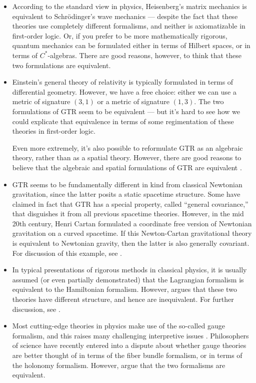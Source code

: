 \begin{itemize}
\item According to the standard view in physics, Heisenberg's matrix
  mechanics is equivalent to Schr{\"o}dinger's wave mechanics ---
  despite the fact that these theories use completely different
  formalisms, and neither is axiomatizable in first-order logic.  Or,
  if you prefer to be more mathematically rigorous, quantum mechanics
  can be formulated either in terms of Hilbert spaces, or in terms of
  $C^*$-algebras.  There are good reasons, however, to think that
  these two formulations are equivalent.
\item Einstein's general theory of relativity is typically formulated
  in terms of differential geometry.  However, we have a free choice:
  either we can use a metric of signature $(3,1)$ or a metric of
  signature $(1,3)$.  The two formulations of GTR seem to be
  equivalent --- but it's hard to see how we could explicate that
  equivalence in terms of some regimentation of these theories in
  first-order logic.

  Even more extremely, it's also possible to reformulate GTR as an
  algebraic theory, rather than as a spatial theory.  However, there
  are good reasons to believe that the algebraic and spatial
  formulations of GTR are equivalent
  \citep[see][]{rosenstock,weatherall2015}.
  
\item GTR seems to be fundamentally different in kind from classical
  Newtonian gravitation, since the latter posits a static spacetime
  structure.  Some have claimed in fact that GTR has a special
  property, called ``general covariance,'' that disguishes it from all
  previous spacetime theories.  However, in the mid 20th century,
  Henri Cartan formulated a coordinate free version of Newtonian
  gravitation on a curved spacetime.  If this Newton-Cartan
  gravitational theory is equivalent to Newtonian gravity, then the
  latter is also generally covariant.  For discussion of this example,
  see \cite{glymour1977,knox2013,weatherall-erk}.

\item In typical presentations of rigorous methods in classical
  physics, it is usually assumed (or even partially demonstrated) that
  the Lagrangian formalism is equivalent to the Hamiltonian formalism.
  However, \cite{north2009} argues that these two theories have
  different structure, and hence are inequivalent.  For further
  discussion, see
  \cite{halvorsonunpublished,swansonhalvorsonunpublished,curiel2014,barrett2014}.

\item Most cutting-edge theories in physics make use of the so-called
  gauge formalism, and this raises many challenging interpretive
  issues \citep[see][]{healey-gauge}.  Philosophers of science have
  recently entered into a dispute about whether gauge theories are
  better thought of in terms of the fiber bundle formalism, or in
  terms of the holonomy formalism.  However, \cite{rosenstock2016}
  argue that the two formalisms are equivalent.
\end{itemize}


